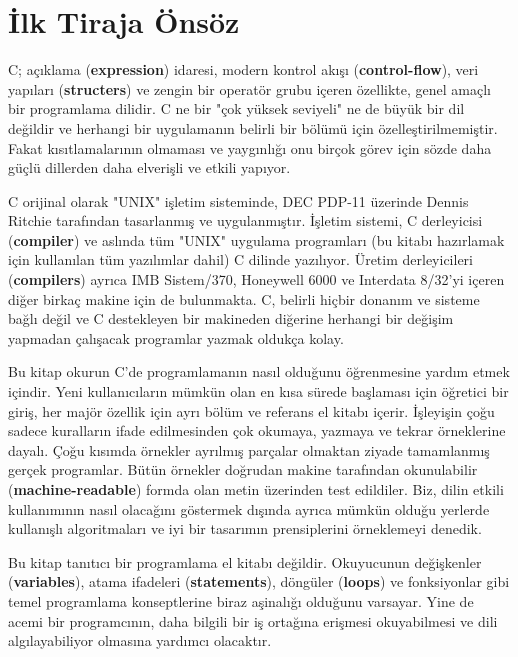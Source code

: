 \documentclass[a4paper,12pt,oneside]{book}
\begin{document}
\chapter*{İlk Tiraja Önsöz}

C; açıklama (\textbf{expression}) idaresi, modern kontrol akışı (\textbf{control-flow}), veri yapıları (\textbf{structers}) ve zengin bir operatör grubu içeren özellikte, genel amaçlı bir programlama dilidir. C ne bir "çok yüksek seviyeli" ne de büyük bir dil değildir ve herhangi bir uygulamanın belirli bir bölümü için özelleştirilmemiştir. Fakat kısıtlamalarının olmaması ve yaygınlığı onu birçok görev için sözde daha güçlü dillerden daha elverişli ve etkili yapıyor.
\par C orijinal olarak "UNIX" işletim sisteminde, DEC PDP-11 üzerinde Dennis Ritchie tarafından tasarlanmış ve uygulanmıştır. İşletim sistemi, C derleyicisi (\textbf{compiler}) ve aslında tüm "UNIX" uygulama programları (bu kitabı hazırlamak için kullanılan tüm yazılımlar dahil) C dilinde yazılıyor. Üretim derleyicileri (\textbf{compilers}) ayrıca IMB Sistem/370, Honeywell 6000 ve Interdata 8/32'yi içeren diğer birkaç makine için de bulunmakta. C, belirli hiçbir donanım ve sisteme bağlı değil ve C destekleyen bir makineden diğerine herhangi bir değişim yapmadan çalışacak programlar yazmak oldukça kolay.
\par Bu kitap okurun C'de programlamanın nasıl olduğunu öğrenmesine yardım etmek içindir. Yeni kullanıcıların mümkün olan en kısa sürede başlaması için öğretici bir giriş, her majör özellik için ayrı bölüm ve referans el kitabı içerir. İşleyişin çoğu sadece kuralların ifade edilmesinden çok okumaya, yazmaya ve tekrar örneklerine dayalı. Çoğu kısımda örnekler ayrılmış parçalar olmaktan ziyade tamamlanmış gerçek programlar. Bütün örnekler doğrudan makine tarafından okunulabilir (\textbf{machine-readable}) formda olan metin üzerinden test edildiler. Biz, dilin etkili kullanımının nasıl olacağını göstermek dışında ayrıca mümkün olduğu yerlerde kullanışlı algoritmaları ve iyi bir tasarımın prensiplerini örneklemeyi denedik.
\par Bu kitap tanıtıcı bir programlama el kitabı değildir. Okuyucunun değişkenler (\textbf{variables}), atama ifadeleri (\textbf{statements}), döngüler (\textbf{loops}) ve fonksiyonlar  gibi temel programlama konseptlerine biraz aşinalığı olduğunu varsayar. Yine de acemi bir programcının, daha bilgili bir iş ortağına erişmesi okuyabilmesi ve dili algılayabiliyor olmasına yardımcı olacaktır. \pagebreak
\end{document}
